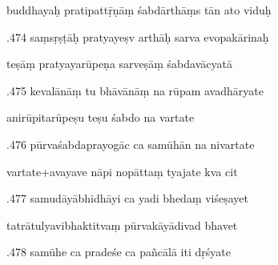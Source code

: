 \documentclass[article,12pt,a4paper]{memoir}%
\newcounter{parCount}
\begin{document}
	  
	  \pstart \leavevmode%
	buddhayaḥ pratipattṝṇāṃ śabdārthāṃs tān ato viduḥ 
	{}
	\pend%
      

	  
	  \pstart {}.474 saṃsṛṣṭāḥ pratyayeṣv arthāḥ sarva evopakārinaḥ 
	{}
	\pend%
      

	  
	  \pstart \leavevmode%
	teṣāṃ pratyayarūpeṇa sarveṣāṃ śabdavācyatā 
	{}
	\pend%
      

	  
	  \pstart {}.475 kevalānāṃ tu bhāvānāṃ na rūpam avadhāryate 
	{}
	\pend%
      

	  
	  \pstart \leavevmode%
	anirūpitarūpeṣu teṣu śabdo na vartate 
	{}
	\pend%
      

	  
	  \pstart {}.476 pūrvaśabdaprayogāc ca samūhān na nivartate 
	{}
	\pend%
      

	  
	  \pstart \leavevmode%
	vartate+avayave nāpi nopāttaṃ tyajate kva cit 
	{}
	\pend%
      

	  
	  \pstart {}.477 samudāyābhidhāyi ca yadi bhedaṃ viśeṣayet 
	{}
	\pend%
      

	  
	  \pstart \leavevmode%
	tatrātulyavibhaktitvaṃ pūrvakāyādivad bhavet 
	{}
	\pend%
      

	  
	  \pstart {}.478 samūhe ca pradeśe ca pañcālā iti dṛśyate 
	{}
	\pend%
      
\end{document}
